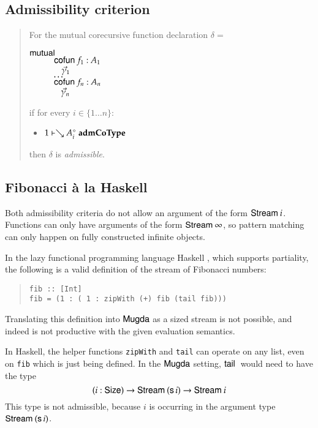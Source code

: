 \subsection{Admissibility criterion}
\begin{quote}
For the mutual corecursive function declaration $\delta =$
\begin{bsp}
$\mathsf{mutual}\:$\\
$\spcx \cofun f_1 : A_1 $\\
$\spcx \spc \vec{\gamma}_1$\\
$\spcx \ldots$\\
$\spcx \cofun f_n : A_n $\\
$\spcx \spc \vec{\gamma}_n$
\end{bsp}
if  for every $i \in \{1 \ldots n \}$:
\begin{itemize}
\item
$1\vdash\searrow A_i^{\diamond}\mbox{ \textbf{admCoType}}$
\end{itemize}
then $\delta$ is \emph{admissible}.
\end{quote}


\subsection{Fibonacci \`a la Haskell}


Both admissibility criteria do not allow an argument of the form $\mathsf{Stream}\: i$.
Functions can only have arguments of the form $\mathsf{Stream}\: \infty$, so pattern matching can only 
happen on fully constructed infinite objects.

In the lazy functional programming language Haskell \cite{haskell}, which supports partiality, the following is a valid definition of the stream of Fibonacci numbers:
\begin{quote}
\begin{verbatim}
fib :: [Int]
fib = (1 : ( 1 : zipWith (+) fib (tail fib)))
\end{verbatim}
\end{quote}
Translating this definition into $\textsf{Mugda}$ as a sized stream is not possible, and indeed is not productive with the given evaluation semantics.

In Haskell, the helper functions \verb+zipWith+ and \verb+tail+ can operate on any list, even on \verb+fib+ which is just being defined.
In the $\textsf{Mugda}$ setting, $\mathsf{tail}\:$ would need to have the type
\[ ( i : \mathsf{Size} ) \rightarrow \mathsf{Stream}\: (\mathsf{s}\, i) \rightarrow \mathsf{Stream}\: i \]
\noindent This type is not admissible, because $i$ is occurring in the argument type $\mathsf{Stream}\: (\mathsf{s}\, i)$.

